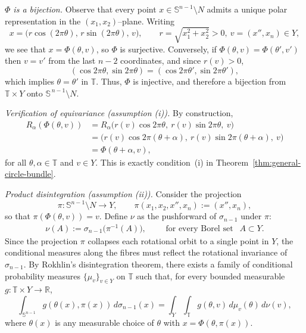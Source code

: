 \documentclass[11pt]{article}
\numberwithin{equation}{section}
\theoremstyle{remark}
\begin{document}
\emph{$\Phi$ is a bijection.}
Observe that every point $x\in\mathbb{S}^{n-1}\setminus N$ admits a unique polar representation in the $(x_1,x_2)$–plane. Writing
\[
x=\big(r\cos(2\pi\theta),\, r\sin(2\pi\theta),\, v\big),
\qquad r=\sqrt{x_1^2+x_2^2}>0,\ v=(x'',x_n)\in Y,
\]
we see that $x=\Phi(\theta,v)$, so $\Phi$ is surjective.
Conversely, if $\Phi(\theta,v)=\Phi(\theta',v')$ then $v=v'$ from the last $n-2$ coordinates, and since $r(v)>0$,
\[
(\cos 2\pi\theta,\sin 2\pi\theta)
 =(\cos 2\pi\theta',\sin 2\pi\theta'),
\]
which implies $\theta=\theta'$ in $\mathbb{T}$. Thus, $\Phi$ is injective, and therefore a bijection from $\mathbb{T} \times Y$ onto $\mathbb{S}^{\,n-1}\setminus N$.

\medskip\noindent
\emph{Verification of equivariance (assumption (i)).}
By construction,
\begin{align*}
R_\alpha(\Phi(\theta,v))
&= R_\alpha\big(r(v)\cos 2\pi\theta,\ r(v)\sin 2\pi\theta,\ v\big)\\
&= \big(r(v)\cos 2\pi(\theta+\alpha),\ r(v)\sin 2\pi(\theta+\alpha),\ v\big)\\
&= \Phi(\theta+\alpha,v),
\end{align*}
for all $\theta,\alpha\in \mathbb{T}$ and $v\in Y$. This is exactly condition~(i) in Theorem~\ref{thm:general-circle-bundle}.


\medskip\noindent
\emph{Product disintegration (assumption (ii)).}
Consider the projection
\[
\pi:\mathbb{S}^{n-1}\setminus N\to Y,\qquad
\pi(x_1,x_2, x'', x_n) := (x'', x_n),
\]
so that $\pi(\Phi(\theta,v))=v$. Define $\nu$ as the pushforward of
$\sigma_{n-1}$ under $\pi$:
\begin{align}\label{definition:measure-nu-sphere}
    \nu(A) := \sigma_{n-1}\big(\pi^{-1}(A)\big),
\qquad \text{ for every Borel set } ~~ A\subset Y.
\end{align}
Since the projection $\pi$ collapses each rotational orbit to a single point in $Y$, the conditional measures along the fibres must reflect the rotational invariance  of $\sigma_{n-1}$. By Rokhlin’s disintegration theorem, there exists a family of conditional probability measures $\{\mu_v\}_{v\in Y}$ on $\mathbb{T}$ such that, for every bounded measurable $g: \mathbb{T}\times Y\to\mathbb{R}$,
\begin{equation}\label{eq:sphere-disintegration}
\int_{\mathbb{S}^{n-1}} g(\theta(x),\pi(x))\,d\sigma_{n-1}(x)
= \int_Y\int_\mathbb{T} g(\theta,v)\,d\mu_v(\theta)\,d\nu(v),
\end{equation}
where $\theta(x)$ is any measurable choice of $\theta$ with
$x=\Phi(\theta,\pi(x))$.
\end{document}
